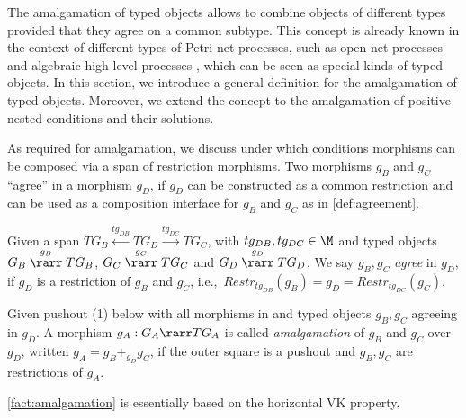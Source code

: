 The amalgamation of typed objects allows to combine objects of different types provided that they agree on a common subtype. 
This concept is already known in the context of different types of Petri net processes, such as open net processes \cite{BCEH01}
and algebraic high-level processes \cite{EG11}, which can be seen as special kinds of typed objects. 
In this section, we introduce a general definition for the amalgamation of typed objects. Moreover, we extend the concept to 
the amalgamation of positive nested conditions and their solutions. 

As  required for amalgamation, we discuss under which conditions morphisms can be composed via a span of restriction morphisms. 
Two morphisms $g_B$ and $g_C$ ``agree'' in a morphism $g_D$, if $g_D$ can be constructed as a common restriction and can be used 
as a composition interface for $g_B$ and $g_C$ as in \autoref{def:agreement}.

\begin{definition}\label{def:agreement}
Given a span $TG_B \stackrel{tg_{DB}}{\longleftarrow} TG_D \stackrel{tg_{DC}}{\longrightarrow} TG_C$, 
with $tg_{DB}, tg_{DC} \in \M$ and typed objects $G_B \stackrel{g_{B}}{\rarr} TG_B$, $G_C \stackrel{g_{C}}{\rarr} TG_C$ and $G_D \stackrel{g_{D}}{\rarr} TG_D$. 
We say $g_{B},g_{C}$ \emph{agree} in $g_{D}$, if $g_{D}$ is a restriction of $g_{B}$ and $g_{C}$, i.e.,~$Restr_{tg_{DB}}(g_{B}) = g_{D} = Restr_{tg_{DC}}(g_{C})$.

Given pushout (1) below with all morphisms in \M and typed objects $g_B, g_C$ agreeing in $g_D$. 
A morphism $g_A : G_A \rarr TG_A$ is called \emph{amalgamation} of $g_B$ and $g_C$ over $g_D$, written $g_A = g_B +_{g_D} g_C$, 
if the outer square is a pushout and $g_B, g_C$ are restrictions of $g_A$.

\end{definition}




\autoref{fact:amalgamation} is essentially based on the horizontal VK property.

